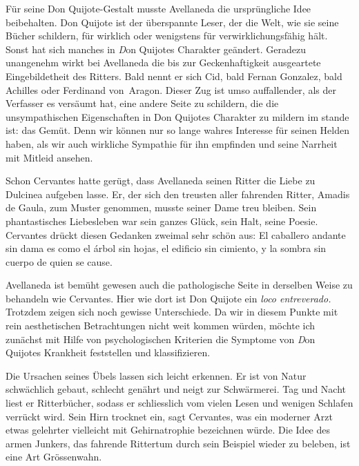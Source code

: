 \blankline

Für seine Don Quijote-Gestalt musste Avellaneda die ursprüngliche
Idee beibehalten. Don Quijote ist der {\quoted überspannte Leser}, der die
Welt, wie sie seine Bücher schildern, für wirklich oder wenigstens für
verwirklichungsfähig hält. Sonst hat sich manches in {\emph Don Quijotes
Charakter} geändert. Geradezu unangenehm wirkt bei Avellaneda
die bis zur Geckenhaftigkeit ausgeartete Eingebildetheit des Ritters.
Bald nennt er sich Cid, bald Fernan Gonzalez, bald Achilles oder
Ferdinand von~Aragon. Dieser Zug ist umso auffallender, als der
Verfasser es versäumt hat, eine andere Seite zu schildern, die die
unsympathischen Eigenschaften in Don Quijotes Charakter zu mildern
im stande ist: das Gemüt. Denn wir können nur so lange wahres
Interesse für seinen Helden haben, als wir auch wirkliche Sympathie für
ihn empfinden und seine Narrheit mit Mitleid ansehen.

Schon Cervantes hatte gerügt, dass Avellaneda seinen Ritter die
Liebe zu Dulcinea aufgeben lasse. Er, der sich den treusten aller
fahrenden Ritter, Amadis de Gaula, zum Muster genommen, musste
seiner Dame treu bleiben. Sein phantastisches Liebesleben war sein
ganzes Glück, sein Halt, seine Poesie. Cervantes drückt diesen Gedanken
zweimal sehr schön aus: {\itquoted\spanish El caballero
andante sin dama es como el árbol sin hojas, el edificio sin cimiento,
y la sombra sin cuerpo de quien se cause.}

Avellaneda ist bemüht gewesen auch die pathologische Seite in
derselben Weise zu behandeln wie Cervantes. Hier wie dort ist Don
Quijote ein {\it\spanish loco entreverado.} Trotzdem zeigen sich noch gewisse
Unterschiede. Da wir in diesem Punkte mit rein aesthetischen Betrachtungen
nicht weit kommen würden, möchte ich zunächst mit Hilfe
von psychologischen Kriterien die Symptome von {\emph Don Quijotes
Krankheit} feststellen und klassifizieren.

Die Ursachen seines Übels lassen sich leicht erkennen. Er ist
von Natur schwächlich gebaut, schlecht genährt und neigt zur Schwärmerei.
Tag und Nacht liest er Ritterbücher, sodass er schliesslich vom vielen
Lesen und wenigen Schlafen verrückt wird. Sein Hirn trocknet ein,
sagt Cervantes, was ein moderner Arzt etwas gelehrter vielleicht mit
Gehirnatrophie bezeichnen würde. Die Idee des armen Junkers, das
fahrende Rittertum durch sein Beispiel wieder zu beleben, ist eine Art
Grössenwahn.

